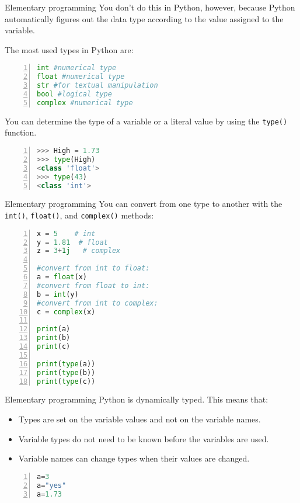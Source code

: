 \begin{frame}[fragile]{Elementary programming}
You don’t do this in Python, however, because Python automatically figures out
the data type according to the value assigned to the variable.

\pause 
The most used types in Python are: 
\begin{lstlisting}[numbers=left,showstringspaces=false,language=python]
int #numerical type
float #numerical type
str #for textual manipulation
bool #logical type
complex #numerical type
\end{lstlisting}
You can determine the type of a variable or a literal
value by using the \lstinline{type()} function.
\begin{lstlisting}[numbers=left,showstringspaces=false,language=python]
>>> High = 1.73 
>>> type(High)
<class 'float'>
>>> type(43)
<class 'int'>
\end{lstlisting}
\end{frame}
\begin{frame}[fragile]{Elementary programming}
You can convert from one type to another with the \verb|int()|, \verb|float()|, and \verb|complex()| methods:
\begin{lstlisting}[numbers=left,showstringspaces=false,language=python]
x = 5    # int
y = 1.81  # float
z = 3+1j   # complex

#convert from int to float:
a = float(x)
#convert from float to int:
b = int(y)
#convert from int to complex:
c = complex(x)

print(a)
print(b)
print(c)

print(type(a))
print(type(b))
print(type(c))
\end{lstlisting}

\end{frame}
\begin{frame}[fragile]{Elementary programming}
Python is dynamically typed. This means that:
\begin{itemize}[<+->]
    \item Types are set on the variable values and not on the variable names.
    \item Variable types do not need to be known before the variables are used.
    \item Variable names can change types when their values are changed.
\end{itemize}
\begin{lstlisting}[numbers=left,showstringspaces=false,language=python]
a=3
a="yes"
a=1.73
\end{lstlisting}
\end{frame}
